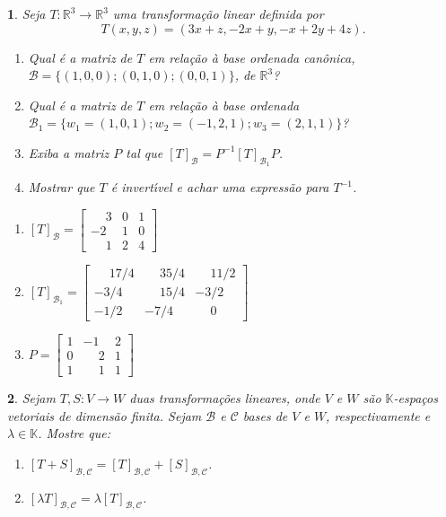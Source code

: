 \documentclass[12pt]{exam}
\newtheorem{exercicio}{}
\newcommand{\real}{\mathbb{R}}
\newcommand{\cp}[1]{\mathbb{#1}}
\begin{document}
\begin{exercicio}
  Seja $T : \real^3 \to \real^3$ uma transforma\c{c}\~ao linear definida por
  \[
    T(x,y,z) = (3x + z,-2x + y,-x+2y + 4z).
  \]
  \begin{enumerate}[label=({\alph*})]
    \item Qual \'e a matriz de $T$ em rela\c{c}\~ao \`a base ordenada can\^onica, $\mathcal{B} = \{(1,0,0); (0,1,0); (0,0,1)\}$, de $\real^3$?
    \item Qual \'e a matriz de $T$ em rela\c{c}\~ao \`a base ordenada $\mathcal{B}_1 = \{w_1 = (1,0,1); w_2 = (-1,2,1); w_3 = (2,1,1)\}$?
    \item Exiba a matriz $P$ tal que $[T]_{\mathcal{B}} = P^{-1}[T]_{\mathcal{B}_1}P$.
    \item Mostrar que $T$ \'e invert{\'\i}vel e achar uma express\~ao para $T^{-1}$.
  \end{enumerate}
  \begin{solucao}
    \begin{enumerate}[label=({\alph*})]
      \item $[T]_\mathcal{B} = \begin{bmatrix}
        \phantom{-}3 & 0 & 1\\
        -2 & 1 & 0\\
        \phantom{-}1 & 2 & 4
      \end{bmatrix}$
      
      \item $[T]_{\mathcal{B}_1} = \begin{bmatrix}
        \phantom{-}17/4 & \phantom{-}35/4 & \phantom{-}11/2\\
        -3/4 & \phantom{-}15/4 & -3/2\\
        -1/2 & -7/4 & \phantom{-}0
      \end{bmatrix}$

      \item $P = \begin{bmatrix}
        1 & -1 & 2\\
        0 & \phantom{-}2 & 1\\
        1 & \phantom{-}1 & 1
      \end{bmatrix}$
    \end{enumerate}
  \end{solucao}
\end{exercicio}

\begin{exercicio}
  Sejam $T, S : V \to W$ duas transforma\c{c}\~oes lineares, onde $V$ e $W$ s\~ao $\cp{K}$-espa\c{c}os vetoriais de dimens\~ao finita. Sejam $\mathcal{B}$ e $\mathcal{C}$ bases de $V$ e $W$, respectivamente e $\lambda \in \cp{K}$. Mostre que:
  \begin{enumerate}[label=({\alph*})]
    \item $[T + S]_{\mathcal{B}, \mathcal{C}} = [T]_{\mathcal{B}, \mathcal{C}} + [S]_{\mathcal{B}, \mathcal{C}}$.
    \item $[\lambda T]_{\mathcal{B}, \mathcal{C}} = \lambda [T]_{\mathcal{B}, \mathcal{C}}$.
  \end{enumerate}
\end{exercicio}
\end{document}
